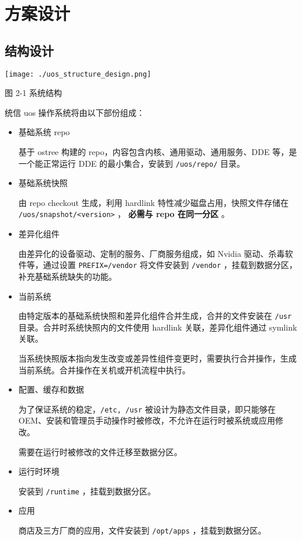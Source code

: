 \documentclass{utart}
\begin{document}
\section{方案设计}
\subsection{结构设计}
\begin{center}
  \begin{adjustbox}{scale=0.55}
    \texttt{[image: ./uos\_structure\_design.png]}
  \end{adjustbox}

  图 2-1 系统结构
\end{center}

统信 uos 操作系统将由以下部份组成：
\begin{itemize}[leftmargin=4em]
\item 基础系统 repo

  基于 ostree 构建的 repo，内容包含内核、通用驱动、通用服务、DDE 等，是一个能正常运行 DDE 的最小集合，安装到 \texttt{/uos/repo/} 目录。
\item 基础系统快照

  由 repo checkout 生成，利用 hardlink 特性减少磁盘占用，快照文件存储在 \texttt{/uos/snapshot/<version>} ， \textbf{必需与 repo 在同一分区} 。
\item 差异化组件

  由差异化的设备驱动、定制的服务、厂商服务组成，如 Nvidia 驱动、杀毒软件等，通过设置 \texttt{PREFIX=/vendor} 将文件安装到 \texttt{/vendor} ，挂载到数据分区，补充基础系统缺失的功能。
\item 当前系统

  由特定版本的基础系统快照和差异化组件合并生成，合并的文件安装在 \texttt{/usr} 目录。合并时系统快照内的文件使用 hardlink 关联，差异化组件通过 symlink 关联。

  当系统快照版本指向发生改变或差异性组件变更时，需要执行合并操作，生成当前系统。合并操作在关机或开机流程中执行。
\item 配置、缓存和数据

  为了保证系统的稳定，\texttt{/etc, /usr} 被设计为静态文件目录，即只能够在 OEM、安装和管理员手动操作时被修改，不允许在运行时被系统或应用修改。

  需要在运行时被修改的文件迁移至数据分区。
\item 运行时环境

  安装到 \texttt{/runtime} ，挂载到数据分区。
\item 应用

  商店及三方厂商的应用，文件安装到 \texttt{/opt/apps} ，挂载到数据分区。
\end{itemize}
\end{document}
